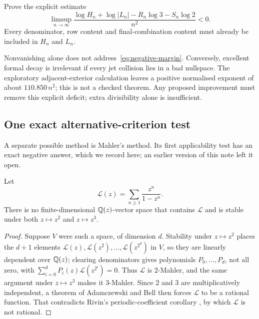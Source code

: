 \documentclass[11pt]{article}
\begin{document}
\begin{problem}
Prove the explicit estimate
\[
 \limsup_{n\to\infty}
 \frac{\log H_n+\log|L_n|-R_n\log3-S_n\log2}{n^2}<0.
\tag{8.3}\label{eq:negative-margin}
\]
Every denominator, row content and final-combination content must already be
included in $H_n$ and $L_n$.
\end{problem}

Nonvanishing alone does not address~\eqref{eq:negative-margin}.  Conversely,
excellent formal decay is irrelevant if every jet collision lies in a bad
nullspace.  The exploratory adjacent-exterior calculation leaves a positive
normalised exponent of about $110.850\,n^2$; this is not a checked theorem.
Any proposed improvement must remove this explicit deficit; extra divisibility
alone is insufficient.

\subsection{One exact alternative-criterion test}

A separate possible method is Mahler's method.  Its first applicability test has
an exact negative answer, which we record here; an earlier version of this note
left it open.

\begin{proposition}\label{res:nomahler}
Let
\[
 \mathcal L(z)=\sum_{n\ge1}\frac{z^n}{1-z^n}.
\]
There is no finite-dimensional $\mathbb{Q}(z)$-vector space that contains $\mathcal L$
and is stable under both $z\mapsto z^2$ and $z\mapsto z^3$.
\end{proposition}

\begin{proof}
Suppose $V$ were such a space, of dimension $d$.  Stability under $z\mapsto z^2$
places the $d+1$ elements $\mathcal L(z),\mathcal L(z^2),\dots,\mathcal
L(z^{2^{d}})$ in $V$, so they are linearly dependent over $\mathbb{Q}(z)$; clearing
denominators gives polynomials $P_0,\dots,P_d$, not all zero, with
$\sum_{i=0}^{d}P_i(z)\mathcal L(z^{2^i})=0$.  Thus $\mathcal L$ is $2$-Mahler,
and the same argument under $z\mapsto z^3$ makes it $3$-Mahler.  Since $2$ and
$3$ are multiplicatively independent, a theorem of Adamczewski and Bell
\cite[Theorem~1]{adamczewskibell2013} then forces $\mathcal L$ to be a rational
function.  That contradicts Rivin's periodic-coefficient corollary
\cite[Cor.~6.4, p.~9]{rivin2026}, by which $\mathcal L$ is not rational.
\end{proof}
\end{document}
